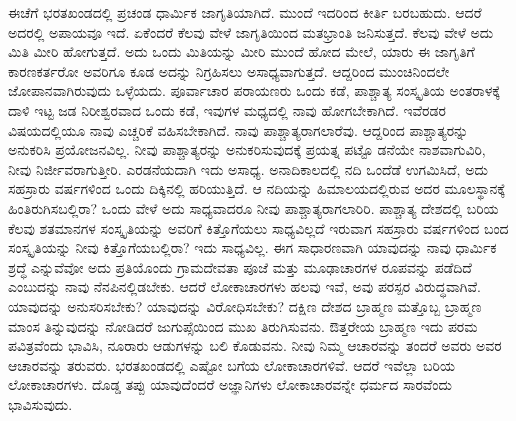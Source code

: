 ಈಚೆಗೆ ಭರತಖಂಡದಲ್ಲಿ ಪ್ರಚಂಡ ಧಾರ್ಮಿಕ ಜಾಗೃತಿಯಾಗಿದೆ. ಮುಂದೆ ಇದರಿಂದ ಕೀರ್ತಿ ಬರಬಹುದು. ಆದರೆ ಅದರಲ್ಲಿ ಅಪಾಯವೂ ಇದೆ. ಏಕೆಂದರೆ ಕೆಲವು ವೇಳೆ ಜಾಗೃತಿಯಿಂದ ಮತಭ್ರಾಂತಿ ಜನಿಸುತ್ತದೆ. ಕೆಲವು ವೇಳೆ ಅದು ಮಿತಿ ಮೀರಿ ಹೋಗುತ್ತದೆ. ಅದು ಒಂದು ಮಿತಿಯನ್ನು ಮೀರಿ ಮುಂದೆ ಹೋದ ಮೇಲೆ, ಯಾರು ಈ ಜಾಗೃತಿಗೆ ಕಾರಣಕರ್ತರೋ ಅವರಿಗೂ ಕೂಡ ಅದನ್ನು ನಿಗ್ರಹಿಸಲು ಅಸಾಧ್ಯವಾಗುತ್ತದೆ. ಆದ್ದರಿಂದ ಮುಂಚಿನಿಂದಲೇ ಜೋಪಾನವಾಗಿರುವುದು ಒಳ್ಳೆಯದು. ಪೂರ್ವಾಚಾರ ಪರಾಯಣರು ಒಂದು ಕಡೆ, ಪಾಶ್ಚಾತ್ಯ ಸಂಸ್ಕೃತಿಯ ಅಂತರಾಳಕ್ಕೆ ದಾಳಿ ಇಟ್ಟ ಜಡ ನಿರೀಶ್ವರವಾದ ಒಂದು ಕಡೆ, ಇವುಗಳ ಮಧ್ಯದಲ್ಲಿ ನಾವು ಹೋಗಬೇಕಾಗಿದೆ. ಇವೆರಡರ ವಿಷಯದಲ್ಲಿಯೂ ನಾವು ಎಚ್ಚರಿಕೆ ವಹಿಸಬೇಕಾಗಿದೆ. ನಾವು ಪಾಶ್ಚಾತ್ಯರಾಗಲಾರೆವು. ಆದ್ದರಿಂದ ಪಾಶ್ಚಾತ್ಯರನ್ನು ಅನುಕರಿಸಿ ಪ್ರಯೋಜನವಿಲ್ಲ. ನೀವು ಪಾಶ್ಚಾತ್ಯರನ್ನು ಅನುಕರಿಸುವುದಕ್ಕೆ ಪ್ರಯತ್ನ ಪಟ್ಟೊ ಡನೆಯೇ ನಾಶವಾಗುವಿರಿ, ನೀವು ನಿರ್ಜೀವರಾಗುತ್ತೀರಿ. ಎರಡನೆಯದಾಗಿ ಇದು ಅಸಾಧ್ಯ. ಅನಾದಿಕಾಲದಲ್ಲಿ ನದಿ ಒಂದೆಡೆ ಉಗಮಿಸಿದೆ, ಅದು ಸಹಸ್ರಾರು ವರ್ಷಗಳಿಂದ ಒಂದು ದಿಕ್ಕಿನಲ್ಲಿ ಹರಿಯುತ್ತಿದೆ. ಆ ನದಿಯನ್ನು ಹಿಮಾಲಯದಲ್ಲಿರುವ ಅದರ ಮೂಲಸ್ಥಾನಕ್ಕೆ ಹಿಂತಿರುಗಿಸಬಲ್ಲಿರಾ? ಒಂದು ವೇಳೆ ಅದು ಸಾಧ್ಯವಾದರೂ ನೀವು ಪಾಶ್ಚಾತ್ಯರಾಗ\-ಲಾರಿರಿ. ಪಾಶ್ಚಾತ್ಯ ದೇಶದಲ್ಲಿ ಬರಿಯ ಕೆಲವು ಶತಮಾನಗಳ ಸಂಸ್ಕೃತಿಯನ್ನು ಅವರಿಗೆ ಕಿತ್ತೊಗೆಯಲು ಸಾಧ್ಯವಿಲ್ಲದೆ ಇರುವಾಗ ಸಹಸ್ರಾರು ವರ್ಷಗಳಿಂದ ಬಂದ ಸಂಸ್ಕೃತಿಯನ್ನು ನೀವು ಕಿತ್ತೊಗೆಯಬಲ್ಲಿರಾ? ಇದು ಸಾಧ್ಯವಿಲ್ಲ. ಈಗ ಸಾಧಾರಣವಾಗಿ ಯಾವುದನ್ನು ನಾವು ಧಾರ್ಮಿಕ ಶ್ರದ್ಧೆ ಎನ್ನುವೆವೋ ಅದು ಪ್ರತಿಯೊಂದು ಗ್ರಾಮದೇವತಾ ಪೂಜೆ ಮತ್ತು ಮೂಢಾಚಾರಗಳ ರೂಪವನ್ನು ಪಡೆದಿದೆ ಎಂಬುದನ್ನು ನಾವು ನೆನಪಿನಲ್ಲಿಡಬೇಕು. ಆದರೆ ಲೋಕಾಚಾರಗಳು ಹಲವು ಇವೆ, ಅವು ಪರಸ್ಪರ ವಿರುದ್ಧವಾಗಿವೆ. ಯಾವುದನ್ನು ಅನುಸರಿಸಬೇಕು? ಯಾವುದನ್ನು ವಿರೋಧಿಸಬೇಕು? ದಕ್ಷಿಣ ದೇಶದ ಬ್ರಾಹ್ಮಣ ಮತ್ತೊಬ್ಬ ಬ್ರಾಹ್ಮಣ ಮಾಂಸ ತಿನ್ನುವುದನ್ನು ನೋಡಿದರೆ ಜುಗುಪ್ಸೆಯಿಂದ ಮುಖ ತಿರುಗಿಸುವನು. ಔತ್ತರೇಯ ಬ್ರಾಹ್ಮಣ ಇದು ಪರಮ ಪವಿತ್ರವೆಂದು ಭಾವಿಸಿ, ನೂರಾರು ಆಡುಗಳನ್ನು ಬಲಿ ಕೊಡುವನು. ನೀವು ನಿಮ್ಮ ಆಚಾರವನ್ನು ತಂದರೆ ಅವರು ಅವರ ಆಚಾರವನ್ನು ತರುವರು. ಭರತಖಂಡದಲ್ಲಿ ಎಷ್ಟೋ ಬಗೆಯ ಲೋಕಾಚಾರಗಳಿವೆ. ಆದರೆ ಇವೆಲ್ಲಾ ಬರಿಯ ಲೋಕಾಚಾರಗಳು. ದೊಡ್ಡ ತಪ್ಪು ಯಾವುದೆಂದರೆ ಅಜ್ಞಾನಿಗಳು ಲೋಕಾಚಾರವನ್ನೇ ಧರ್ಮದ ಸಾರವೆಂದು ಭಾವಿಸುವುದು.

